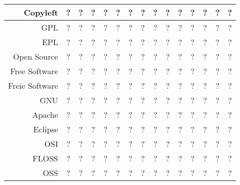\documentclass[
  DIV=calc,
  BCOR=5mm,
  11pt,
  headings=small,
  oneside,
  abstract=true,
  toc=bib,
  english,ngerman]{scrartcl}
\begin{document}
\begin{table}
\begin{center}
\begin{tabular}[h]{|r||c|c|c||c|c||c|c|c|c|c|c||c|c|c|}
\hline
Copyleft
  & ? & ? & ? & ? & ? 
  & ? & ? & ? & ? & ? 
  & ? & ? & ? & ?\\
\hline
\hline
GPL
  & ? & ? & ? & ? & ? 
  & ? & ? & ? & ? & ? 
  & ? & ? & ? & ?\\
\hline
EPL
  & ? & ? & ? & ? & ? 
  & ? & ? & ? & ? & ? 
  & ? & ? & ? & ?\\
\hline 
\hline
Open Source
  & ? & ? & ? & ? & ? 
  & ? & ? & ? & ? & ? 
  & ? & ? & ? & ?\\
\hline
Free Software
  & ? & ? & ? & ? & ? 
  & ? & ? & ? & ? & ? 
  & ? & ? & ? & ?\\
\hline
Freie Software
  & ? & ? & ? & ? & ? 
  & ? & ? & ? & ? & ? 
  & ? & ? & ? & ?\\
\hline
GNU
  & ? & ? & ? & ? & ? 
  & ? & ? & ? & ? & ? 
  & ? & ? & ? & ?\\
\hline
Apache
  & ? & ? & ? & ? & ? 
  & ? & ? & ? & ? & ? 
  & ? & ? & ? & ?\\
\hline
Eclipse
  & ? & ? & ? & ? & ? 
  & ? & ? & ? & ? & ? 
  & ? & ? & ? & ?\\
\hline
\hline
OSI
  & ? & ? & ? & ? & ? 
  & ? & ? & ? & ? & ? 
  & ? & ? & ? & ?\\
\hline
FLOSS
  & ? & ? & ? & ? & ? 
  & ? & ? & ? & ? & ? 
  & ? & ? & ? & ?\\
\hline
OSS
  & ? & ? & ? & ? & ? 
  & ? & ? & ? & ? & ? 
  & ? & ? & ? & ?\\
\hline
\end{tabular}
\end{center}
\end{table}
\newpage
\small

\end{document}

